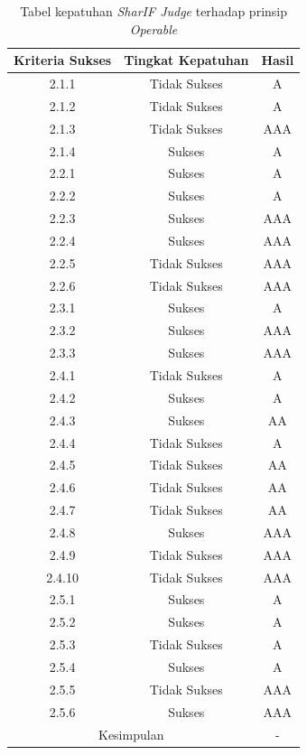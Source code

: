 \documentclass[a4paper,twoside]{article}
\begin{document}
\begin{enumerate}
		\begin{table}[H]
			\centering
			\caption{Tabel kepatuhan \textit{SharIF Judge} terhadap prinsip \textit{Operable}}
			\label{tab:kepatuhan_sharif_judge_operable}
			\begin{tabular}{|c|c|c|}
				\hline
				Kriteria Sukses & Tingkat Kepatuhan & Hasil \\
				\hline
				2.1.1 & Tidak Sukses & A\\
				2.1.2 & Tidak Sukses & A\\
				2.1.3 & Tidak Sukses & AAA\\
				2.1.4 & Sukses & A\\
				2.2.1 & Sukses & A\\
				2.2.2 & Sukses & A\\
				2.2.3 & Sukses & AAA\\
				2.2.4 & Sukses & AAA\\
				2.2.5 & Tidak Sukses & AAA\\
				2.2.6 & Tidak Sukses & AAA\\
				2.3.1 & Sukses & A\\
				2.3.2 & Sukses & AAA\\
				2.3.3 & Sukses & AAA\\
				2.4.1 & Tidak Sukses & A\\
				2.4.2 & Sukses & A\\
				2.4.3 & Sukses & AA\\
				2.4.4 & Tidak Sukses & A\\
				2.4.5 & Tidak Sukses & AA\\
				2.4.6 & Tidak Sukses & AA\\
				2.4.7 & Tidak Sukses & AA\\
				2.4.8 & Sukses & AAA\\
				2.4.9 & Tidak Sukses & AAA\\
				2.4.10 & Tidak Sukses & AAA\\
				2.5.1 & Sukses & A\\
				2.5.2 & Sukses & A\\
				2.5.3 & Tidak Sukses & A\\
				2.5.4 & Sukses & A\\
				2.5.5 & Tidak Sukses & AAA\\
				2.5.6 & Sukses & AAA\\
				\hline
				\multicolumn{2}{|c|}{Kesimpulan} & - \\
				\hline
			\end{tabular}
		\end{table}
		

\end{enumerate}
\end{document}
